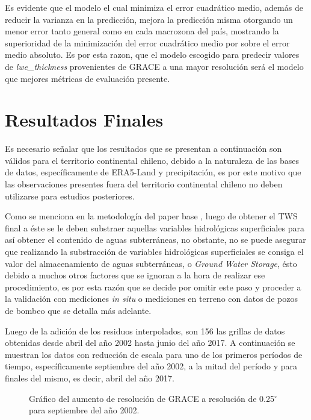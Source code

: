 Es evidente que el modelo el cual minimiza el error cuadrático medio, además de reducir la varianza en la predicción, mejora la predicción misma otorgando un menor error tanto
general como en cada macrozona del país, mostrando la superioridad de la minimización del error cuadrático medio por sobre el error medio absoluto. Es por esta razon, que el modelo escogido para 
predecir valores de \textit{lwe\_thickness} provenientes de GRACE a una mayor resolución será el modelo que mejores métricas de evaluación presente.
%
%
%
%
\section{Resultados Finales}
Es necesario señalar que los resultados que se presentan a continuación son válidos para el territorio continental chileno, debido a la naturaleza de las bases de datos, específicamente de ERA5-Land y precipitación, es 
por este motivo que las observaciones presentes fuera del territorio continental chileno no deben utilizarse para estudios posteriores.

Como se menciona en la metodología del paper base \cite{11}, luego de obtener el TWS final a éste se le deben substraer aquellas variables hidrológicas superficiales para así
obtener el contenido de aguas subterráneas, no obstante, no se puede asegurar que realizando la substracción de variables hidrológicas superficiales se consiga el valor del almacenamiento de aguas subterráneas, o 
\textit{Ground Water Storage}, ésto debido a muchos otros factores que se ignoran a la hora de realizar ese procedimiento, es por esta razón que se decide por omitir este paso y proceder a la validación con mediciones \textit{in situ} o mediciones en terreno con datos de pozos de bombeo que 
se detalla más adelante.

Luego de la adición de los residuos interpolados, son 156 las grillas de datos obtenidas desde abril del año 2002 hasta junio del año 2017. A continuación se muestran los datos con reducción de escala para
uno de los primeros períodos de tiempo, específicamente septiembre del año 2002, a la mitad del período y para finales del mismo, es decir, abril del año 2017.

\begin{figure}[H]
    \centering
          \goodgap
          \vskip -0.1in
    \caption[\textit{Downscalling} final para el mes 09/2002]{Gráfico del aumento de resolución de GRACE a resolución de 0.25$^{\circ}$ para septiembre del año 2002.}
    \label{dsf02}
\end{figure}


